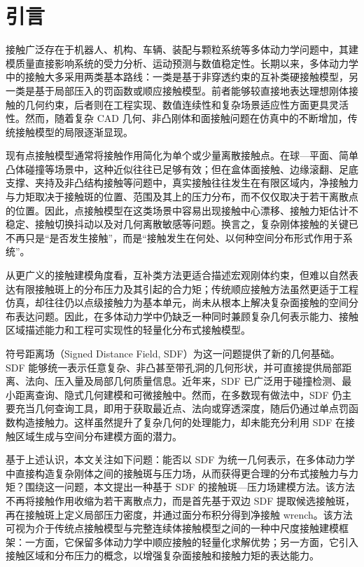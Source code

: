 \section{引言}
接触广泛存在于机器人、机构、车辆、装配与颗粒系统等多体动力学问题中，其建模质量直接影响系统的受力分析、运动预测与数值稳定性。长期以来，多体动力学中的接触大多采用两类基本路线：一类是基于非穿透约束的互补类硬接触模型，另一类是基于局部压入的罚函数或顺应接触模型。前者能够较直接地表达理想刚体接触的几何约束，后者则在工程实现、数值连续性和复杂场景适应性方面更具灵活性。然而，随着复杂 CAD 几何、非凸刚体和面接触问题在仿真中的不断增加，传统接触模型的局限逐渐显现。

现有点接触模型通常将接触作用简化为单个或少量离散接触点。在球—平面、简单凸体碰撞等场景中，这种近似往往已足够有效；但在盒体面接触、边缘滚翻、足底支撑、夹持及非凸结构接触等问题中，真实接触往往发生在有限区域内，净接触力与力矩取决于接触斑的位置、范围及其上的压力分布，而不仅仅取决于若干离散点的位置。因此，点接触模型在这类场景中容易出现接触中心漂移、接触力矩估计不稳定、接触切换抖动以及对几何离散敏感等问题。换言之，复杂刚体接触的关键已不再只是“是否发生接触”，而是“接触发生在何处、以何种空间分布形式作用于系统”。

从更广义的接触建模角度看，互补类方法更适合描述宏观刚体约束，但难以自然表达有限接触斑上的分布压力及其引起的合力矩；传统顺应接触方法虽然更适于工程仿真，却往往仍以点级接触力为基本单元，尚未从根本上解决复杂面接触的空间分布表达问题。因此，在多体动力学中仍缺乏一种同时兼顾复杂几何表示能力、接触区域描述能力和工程可实现性的轻量化分布式接触模型。

符号距离场（Signed Distance Field, SDF）为这一问题提供了新的几何基础。SDF 能够统一表示任意复杂、非凸甚至带孔洞的几何形状，并可直接提供局部距离、法向、压入量及局部几何质量信息。近年来，SDF 已广泛用于碰撞检测、最小距离查询、隐式几何建模和可微接触中。然而，在多数现有做法中，SDF 仍主要充当几何查询工具，即用于获取最近点、法向或穿透深度，随后仍通过单点罚函数构造接触力。这样虽然提升了复杂几何的处理能力，却未能充分利用 SDF 在接触区域生成与空间分布建模方面的潜力。

基于上述认识，本文关注如下问题：能否以 SDF 为统一几何表示，在多体动力学中直接构造复杂刚体之间的接触斑与压力场，从而获得更合理的分布式接触力与力矩？围绕这一问题，本文提出一种基于 SDF 的接触斑—压力场建模方法。该方法不再将接触作用收缩为若干离散点力，而是首先基于双边 SDF 提取候选接触斑，再在接触斑上定义局部压力密度，并通过面分布积分得到净接触 wrench。该方法可视为介于传统点接触模型与完整连续体接触模型之间的一种中尺度接触建模框架：一方面，它保留多体动力学中顺应接触的轻量化求解优势；另一方面，它引入接触区域和分布压力的概念，以增强复杂面接触和接触力矩的表达能力。

